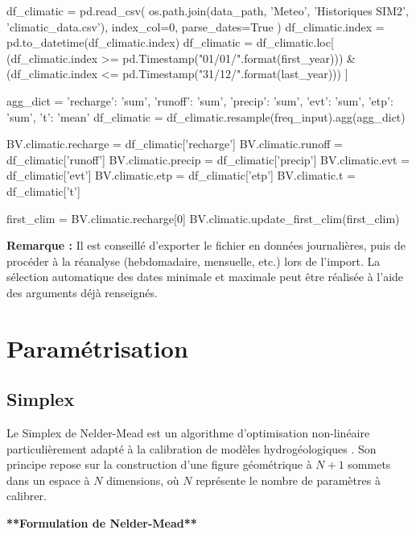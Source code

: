 \begin{pythoncode}[]
df_climatic = pd.read_csv(
    os.path.join(data_path, 'Meteo', 'Historiques SIM2', 'climatic_data.csv'),
    index_col=0, parse_dates=True
)
df_climatic.index = pd.to_datetime(df_climatic.index)
df_climatic = df_climatic.loc[
    (df_climatic.index >= pd.Timestamp("01/01/{}".format(first_year))) &
    (df_climatic.index <= pd.Timestamp("31/12/{}".format(last_year)))
]

agg_dict = {
    'recharge': 'sum',
    'runoff': 'sum',
    'precip': 'sum',
    'evt': 'sum',
    'etp': 'sum',
    't': 'mean'
}
df_climatic = df_climatic.resample(freq_input).agg(agg_dict)

BV.climatic.recharge = df_climatic['recharge']
BV.climatic.runoff = df_climatic['runoff']
BV.climatic.precip = df_climatic['precip']
BV.climatic.evt = df_climatic['evt']
BV.climatic.etp = df_climatic['etp']
BV.climatic.t = df_climatic['t']

first_clim = BV.climatic.recharge[0]
BV.climatic.update_first_clim(first_clim)
\end{pythoncode}

\begin{TipBox}
    \textbf{Remarque :} Il est conseillé d’exporter le fichier en données journalières, puis de procéder à la réanalyse (hebdomadaire, mensuelle, etc.) lors de l’import. La sélection automatique des dates minimale et maximale peut être réalisée à l’aide des arguments déjà renseignés.
\end{TipBox}

\section{Paramétrisation}
\label{sec:parametrisation}

\subsection{Simplex}
\label{sec:simplex}

Le Simplex de Nelder-Mead est un algorithme d'optimisation non-linéaire particulièrement adapté à la calibration de modèles hydrogéologiques \parencite{gaoImplementingNelderMeadSimplex2012}. Son principe repose sur la construction d'une figure géométrique à \(N+1\) sommets dans un espace à \(N\) dimensions, où \(N\) représente le nombre de paramètres à calibrer.

\vspace{2em}
\noindent\textbf{**Formulation de Nelder-Mead**}\\

